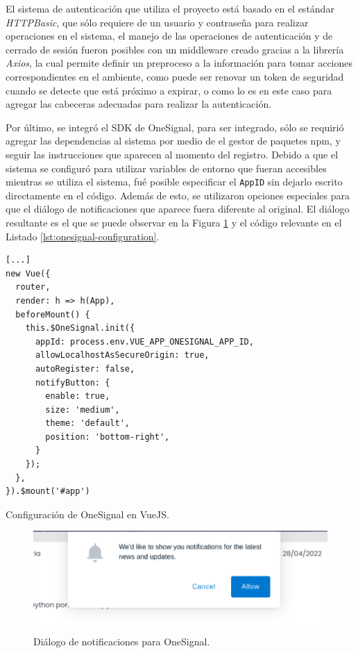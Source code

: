 El sistema de autenticación que utiliza el proyecto está basado en el estándar \textit{HTTPBasic}, que sólo requiere de un usuario y contraseña para realizar operaciones en el sistema, el manejo de las operaciones de autenticación y de cerrado de sesión fueron posibles con un middleware creado gracias a la librería \textit{Axios}, la cual permite definir un preproceso a la información para tomar acciones correspondientes en el ambiente, como puede ser renovar un token de seguridad cuando se detecte que está próximo a expirar, o como lo es en este caso para agregar las cabeceras adecuadas para realizar la autenticación.


Por último, se integró el SDK de OneSignal, para ser integrado, sólo se requirió agregar las dependencias al sistema por medio de el gestor de paquetes npm, y seguir las instrucciones que aparecen al momento del registro. Debido a que el sistema se configuró para utilizar variables de entorno que fueran accesibles mientras se utiliza el sistema, fué posible especificar el \texttt{AppID} sin dejarlo escrito directamente en el código. Además de esto, se utilizaron opciones especiales para que el diálogo de notificaciones que aparece fuera diferente al original. El diálogo resultante es el que se puede observar en la Figura \ref{fig:onesignal-notifications-dialog} y el código relevante en el Listado \ref{lst:onesignal-configuration}.

\begin{listing}
\begin{verbatim}
[...]
new Vue({
  router,
  render: h => h(App),
  beforeMount() {
    this.$OneSignal.init({
      appId: process.env.VUE_APP_ONESIGNAL_APP_ID,
      allowLocalhostAsSecureOrigin: true,
      autoRegister: false,
      notifyButton: {
        enable: true,
        size: 'medium',
        theme: 'default',
        position: 'bottom-right',
      }
    });
  },
}).$mount('#app')
\end{verbatim}
\caption{Configuración de OneSignal en VueJS.}
\label{lst:onesignal-configuration}
\end{listing}

\begin{figure}[!ht]
	\centering
	\includegraphics[width=0.7\linewidth]{images/screenshots/2.0.1-onesignal-notifications.png}
	\caption{Diálogo de notificaciones para OneSignal.}
	\label{fig:onesignal-notifications-dialog}
\end{figure}
